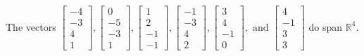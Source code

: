 \begin{exercise}
\begin{exerciseStatement}
  \end{exerciseStatement}
  \begin{exerciseAnswer}
   The vectors \(\left[\begin{array}{r}
-4 \\
-3 \\
4 \\
1
\end{array}\right] , \left[\begin{array}{r}
0 \\
-5 \\
-3 \\
1
\end{array}\right] , \left[\begin{array}{r}
1 \\
2 \\
-1 \\
-1
\end{array}\right] , \left[\begin{array}{r}
-1 \\
-3 \\
4 \\
2
\end{array}\right] , \left[\begin{array}{r}
3 \\
4 \\
-1 \\
0
\end{array}\right] , \text{ and } \left[\begin{array}{r}
4 \\
-1 \\
3 \\
3
\end{array}\right]\) 
  	 do  
	span \(\mathbb{R}^4\).
  


  \end{exerciseAnswer}
\end{exercise}